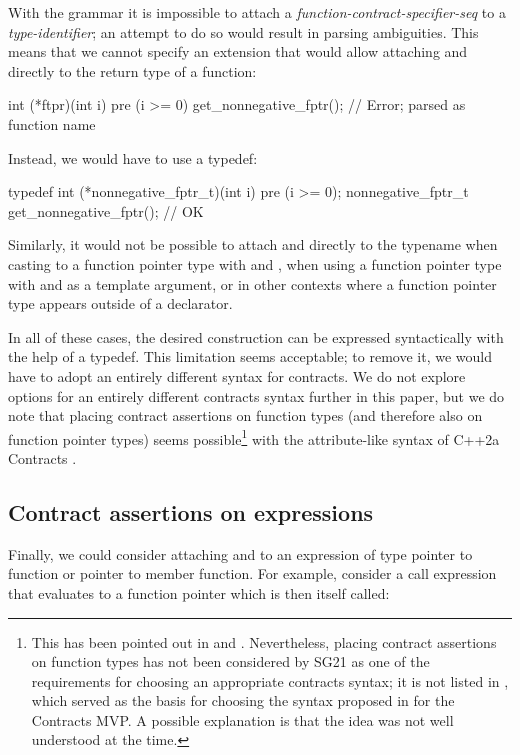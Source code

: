 With the \cite{P2900R8} grammar it is impossible to attach a \emph{function-contract-specifier-seq} to a \emph{type-identifier}; an attempt to do so would result in parsing ambiguities. This means that we cannot specify an extension that would allow attaching  and  directly to the return type of a function:
\begin{codeblock}
int (*ftpr)(int i) pre (i >= 0) get_nonnegative_fptr();  // Error;  parsed as function name
\end{codeblock}
Instead, we would have to use a typedef:
\begin{codeblock}
typedef int (*nonnegative_fptr_t)(int i) pre (i >= 0); 
nonnegative_fptr_t get_nonnegative_fptr();  // OK
\end{codeblock}
Similarly, it would not be possible to attach  and  directly to the typename when casting to a function pointer type with   and , when using a function pointer type with  and  as a template argument, or in other contexts where a function pointer type appears outside of a declarator.

In all of these cases, the desired construction can be expressed syntactically with the help of a typedef. This limitation seems acceptable; to remove it, we would have to adopt an entirely different syntax for contracts. We do not explore options for an entirely different contracts syntax further in this paper, but we do note that placing contract assertions on function types (and therefore also on function pointer types) seems possible\footnote{This has been pointed out in \cite{P2935R4} and \cite{P3028R0}. Nevertheless,  placing contract assertions on function types has not been considered by SG21 as one of the requirements for choosing an appropriate contracts syntax; it is not listed in \cite{P2885R3}, which served as the basis for choosing the syntax proposed in \cite{P2961R2} for the Contracts MVP. A possible explanation is that the idea was not well understood at the time.} with the attribute-like syntax of C++2a Contracts \cite{P0542R5}. 

\subsection{Contract assertions on expressions}
\label{syntax_expr}

Finally, we could consider attaching  and  to an expression of type pointer to function or pointer to member function. For example, consider a call expression that evaluates to a function pointer which is then itself called:

